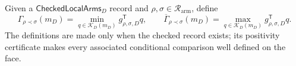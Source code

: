 Given a \(\mathsf{CheckedLocalArms}_D\) record and \(\rho,\sigma\in\mathcal R_{\mathrm{arm}}\), define
\[
\Gamma_{\rho\prec\sigma}(m_D)
=\min_{q\in\mathcal K_D(m_D)}g_{\rho,\sigma,D}^{\mathsf T}q,
\qquad
\overline\Gamma_{\rho\prec\sigma}(m_D)
=\max_{q\in\mathcal K_D(m_D)}g_{\rho,\sigma,D}^{\mathsf T}q.
\]
The definitions are made only when the checked record exists; its positivity certificate makes every associated conditional comparison well defined on the face.